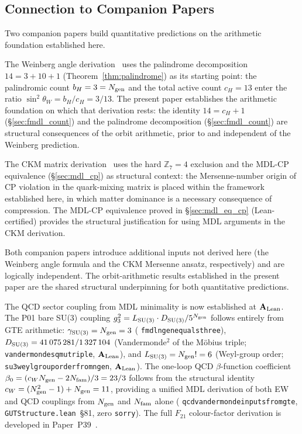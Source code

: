 \documentclass[11pt]{article}
\theoremstyle{remark}
\newcommand{\Ngen}{N_{\rm gen}}
\newcommand{\cH}{c_H}
\newcommand{\lean}[1]{%
  \penalty-100
  \begingroup\def\_{\textunderscore\allowbreak}\texttt{#1}\endgroup}
\newcommand{\sinwsq}{\sin^2\!\theta_W}
\newcommand{\CatAL}{\ensuremath{\textbf{A}_{\rm Lean}}}
\begin{document}
\subsection{Connection to Companion Papers}

Two companion papers build quantitative predictions on the arithmetic foundation
established here.

The Weinberg angle derivation~\cite{SpivackWeinberg} uses the palindrome decomposition
$14 = 3 + 10 + 1$ (Theorem~\ref{thm:palindrome}) as its starting point: the palindromic
count $b_H = 3 = \Ngen$ and the total active count $c_H = 13$ enter the ratio
$\sinwsq = b_H / c_H = 3/13$.
The present paper establishes the arithmetic foundation on which that derivation rests:
the identity $14 = \cH + 1$ (\S\ref{sec:fmdl_count}) and the palindrome decomposition
(\S\ref{sec:fmdl_count}) are structural consequences of the orbit arithmetic, prior to
and independent of the Weinberg prediction.

The CKM matrix derivation~\cite{SpivackCKM} uses the hard $\mathbb{Z}_7 = 4$ exclusion
and the MDL-CP equivalence (\S\ref{sec:mdl_cp}) as structural context: the
Mersenne-number origin of CP violation in the quark-mixing matrix is placed within the
framework established here, in which matter dominance is a necessary consequence of
compression.
The MDL-CP equivalence proved in \S\ref{sec:mdl_eq_cp} (Lean-certified) provides the
structural justification for using MDL arguments in the CKM derivation.

Both companion papers introduce additional inputs not derived here (the Weinberg angle
formula and the CKM Mersenne ansatz, respectively) and are logically independent.
The orbit-arithmetic results established in the present paper are the shared structural
underpinning for both quantitative predictions.

The QCD sector coupling from MDL minimality is now established at $\CatAL$.
The P01 bare SU(3) coupling $g_3^2 = L_{\rm SU(3)} \cdot D_{\rm SU(3)} / 5^{N_{\rm gen}}$
follows entirely from GTE arithmetic:
$\gamma_{\rm SU(3)} = N_{\rm gen} = 3$ (\lean{fmdl\_ngen\_equals\_three}),
$D_{\rm SU(3)} = 41\,075\,281/1\,327\,104$ (Vandermonde$^2$ of the Möbius triple;
\lean{vandermonde\_sq\_mu\_triple}, $\CatAL$), and
$L_{\rm SU(3)} = N_{\rm gen}! = 6$ (Weyl-group order; \lean{su3\_weyl\_group\_order\_from\_ngen},
$\CatAL$).
The one-loop QCD $\beta$-function coefficient
$\beta_0 = (c_W N_{\rm gen} - 2N_{\rm fam})/3 = 23/3$ follows from the structural identity
$c_W = (N_{\rm gen}^2 - 1) + N_{\rm gen} = 11$, providing a unified MDL derivation of both
EW and QCD couplings from $N_{\rm gen}$ and $N_{\rm fam}$ alone
(\lean{qcd\_vandermonde\_inputs\_from\_gte}, \texttt{GUTStructure.lean}~\S81, zero \texttt{sorry}).
The full $F_{21}$ colour-factor derivation is developed in Paper~P39~\cite{SpivackGTEQCDStructure}.
\end{document}
